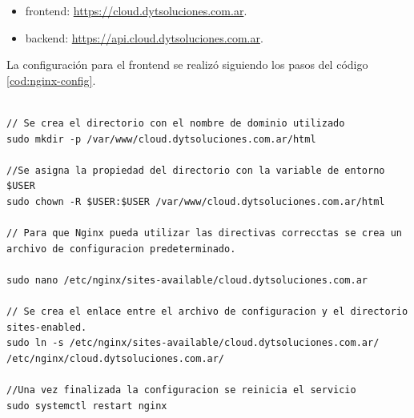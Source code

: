 \begin{itemize}
	\item frontend: \url{https://cloud.dytsoluciones.com.ar}.
	
	\item backend: \url{https://api.cloud.dytsoluciones.com.ar}.
\end{itemize}

La configuración para el frontend se realizó siguiendo los pasos del código \ref{cod:nginx-config}.

\begin{lstlisting}[label=cod:nginx-config,caption=Configuración de Nginx en servidor con sistema operativo Linux.] 

// Se crea el directorio con el nombre de dominio utilizado
sudo mkdir -p /var/www/cloud.dytsoluciones.com.ar/html

//Se asigna la propiedad del directorio con la variable de entorno $USER
sudo chown -R $USER:$USER /var/www/cloud.dytsoluciones.com.ar/html

// Para que Nginx pueda utilizar las directivas correcctas se crea un archivo de configuracion predeterminado. 

sudo nano /etc/nginx/sites-available/cloud.dytsoluciones.com.ar

// Se crea el enlace entre el archivo de configuracion y el directorio sites-enabled.
sudo ln -s /etc/nginx/sites-available/cloud.dytsoluciones.com.ar/ /etc/nginx/cloud.dytsoluciones.com.ar/

//Una vez finalizada la configuracion se reinicia el servicio
sudo systemctl restart nginx
\end{lstlisting} 

